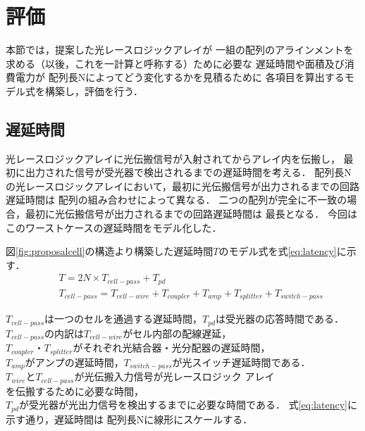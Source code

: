 \section{評価}
本節では，提案した光レースロジックアレイが
一組の配列のアラインメントを求める（以後，これを一計算と呼称する）ために必要な
遅延時間や面積及び消費電力が
配列長Nによってどう変化するかを見積るために
各項目を算出するモデル式を構築し，評価を行う．

\subsection{遅延時間}
光レースロジックアレイに光伝搬信号が入射されてからアレイ内を伝搬し，
最初に出力された信号が受光器で検出されるまでの遅延時間を考える．
配列長Nの光レースロジックアレイにおいて，最初に光伝搬信号が出力されるまでの回路遅延時間は
配列の組み合わせによって異なる．
二つの配列が完全に不一致の場合，最初に光伝搬信号が出力されるまでの回路遅延時間は
最長となる．
今回はこのワーストケースの遅延時間をモデル化した．

図\ref{fig:proposalcell}の構造より構築した遅延時間$T$のモデル式を式\ref{eq:latency}に示す．
\begin{eqnarray}
&&T = 2N \times T_{cell-pass}+T_{pd} \nonumber \\
&&T_{cell-pass} = T_{cell-wire}+T_{coupler}+T_{amp}+T_{splitter}+T_{switch-pass}
\label{eq:latency}
\end{eqnarray}

$T_{cell-pass}は一つのセルを通過する遅延時間，T_{pd}は受光器の応答時間である．$
$T_{cell-pass}の内訳はT_{cell-wire}がセル内部の配線遅延，$
$T_{coupler}・T_{splitter}がそれぞれ光結合器・光分配器の遅延時間，$
$T_{amp}がアンプの遅延時間，T_{switch-pass}が光スイッチ遅延時間である．$
$T_{wire}とT_{cell-pass}が光伝搬入力信号が$光レースロジック アレイ$を伝搬するために必要な時間，$
$T_{pd}が受光器が光出力信号を検出するまでに必要な時間である．$
式\ref{eq:latency}に示す通り，遅延時間は
配列長Nに線形にスケールする．

